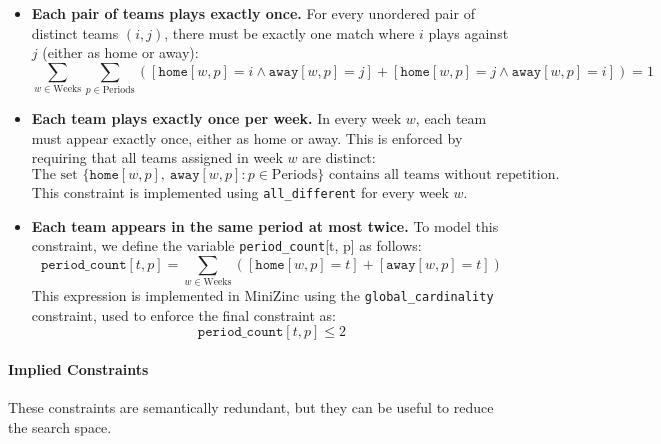 \documentclass[11pt]{article}
\begin{document}
\begin{itemize} 
    \item \textbf{Each pair of teams plays exactly once.}  
    For every unordered pair of distinct teams $(i, j)$, there must be exactly one match where $i$ plays against $j$ (either as home or away):
    \begin{equation*}
        \sum_{w \in \text{Weeks}} \sum_{p \in \text{Periods}} \left( [\texttt{home}[w,p] = i \land \texttt{away}[w,p] = j] + [\texttt{home}[w,p] = j \land \texttt{away}[w,p] = i] \right) = 1
    \end{equation*}

    \item \textbf{Each team plays exactly once per week.}  
    In every week $w$, each team must appear exactly once, either as home or away. This is enforced by requiring that all teams assigned in week $w$ are distinct:
    \begin{equation*}
        \text{The set } \{\texttt{home}[w,p],\ \texttt{away}[w,p] : p \in \text{Periods}\} \text{ contains all teams without repetition.}
    \end{equation*}
    This constraint is implemented using \texttt{all\_different} for every week $w$.

    \item \textbf{Each team appears in the same period at most twice.}  
    To model this constraint, we define the variable \texttt{period\_count}[t, p] as follows:
    \begin{equation*}
        \texttt{period\_count}[t, p] = \sum_{w \in \text{Weeks}} \left( [\texttt{home}[w,p] = t] + [\texttt{away}[w,p] = t] \right)
    \end{equation*}
    This expression is implemented in MiniZinc using the \texttt{global\_cardinality} constraint, used to enforce the final constraint as:
    \begin{equation*}
        \texttt{period\_count}[t, p] \leq 2
    \end{equation*}
\end{itemize}


\paragraph{Implied Constraints}
These constraints are semantically redundant, but they can be useful to reduce the search space.
\end{document}
